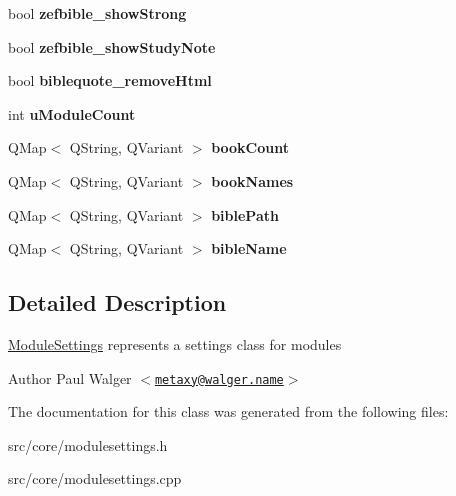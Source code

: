 \begin{DoxyCompactItemize}
\item 
\hypertarget{classModuleSettings_a511bd56eead503c3be216489066f100f}{
bool {\bfseries zefbible\_\-showStrong}}
\label{classModuleSettings_a511bd56eead503c3be216489066f100f}

\item 
\hypertarget{classModuleSettings_a855e48f769627a54b2643a872e5838ac}{
bool {\bfseries zefbible\_\-showStudyNote}}
\label{classModuleSettings_a855e48f769627a54b2643a872e5838ac}

\item 
\hypertarget{classModuleSettings_a8fd9c1bd55ee42af5ee9b24e4fe6ee92}{
bool {\bfseries biblequote\_\-removeHtml}}
\label{classModuleSettings_a8fd9c1bd55ee42af5ee9b24e4fe6ee92}

\item 
\hypertarget{classModuleSettings_ae1c590d226d0b7c994f1b2cc85de342e}{
int {\bfseries uModuleCount}}
\label{classModuleSettings_ae1c590d226d0b7c994f1b2cc85de342e}

\item 
\hypertarget{classModuleSettings_a4b1acf7fab7f33a9daa83a6043216d75}{
QMap$<$ QString, QVariant $>$ {\bfseries bookCount}}
\label{classModuleSettings_a4b1acf7fab7f33a9daa83a6043216d75}

\item 
\hypertarget{classModuleSettings_a8e111bc80c36144142f2249d58d8be0f}{
QMap$<$ QString, QVariant $>$ {\bfseries bookNames}}
\label{classModuleSettings_a8e111bc80c36144142f2249d58d8be0f}

\item 
\hypertarget{classModuleSettings_a40622a8984b16c59c645a304f6c7b3d6}{
QMap$<$ QString, QVariant $>$ {\bfseries biblePath}}
\label{classModuleSettings_a40622a8984b16c59c645a304f6c7b3d6}

\item 
\hypertarget{classModuleSettings_aa5a936a337616dc4edcc2b2b4dbeaae8}{
QMap$<$ QString, QVariant $>$ {\bfseries bibleName}}
\label{classModuleSettings_aa5a936a337616dc4edcc2b2b4dbeaae8}

\end{DoxyCompactItemize}


\subsection{Detailed Description}
\hyperlink{classModuleSettings}{ModuleSettings} represents a settings class for modules

\begin{DoxyAuthor}{Author}
Paul Walger $<$\href{mailto:metaxy@walger.name}{\tt metaxy@walger.name}$>$ 
\end{DoxyAuthor}


The documentation for this class was generated from the following files:\begin{DoxyCompactItemize}
\item 
src/core/modulesettings.h\item 
src/core/modulesettings.cpp\end{DoxyCompactItemize}
